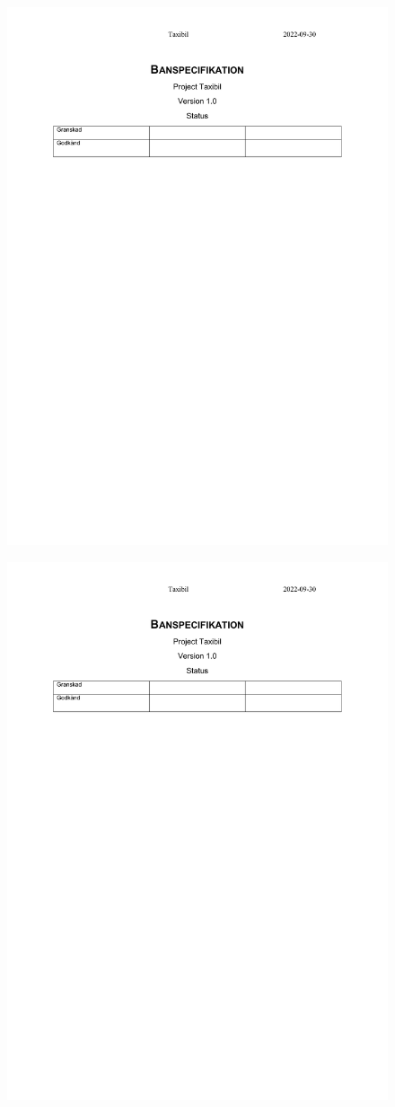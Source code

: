 \documentclass[10pt,oneside,swedish]{lips}
\begin{document}
\begin{figure}[H]
    \includegraphics[width=.95\textwidth, page=2]{Banspec.pdf}
\end{figure}
\begin{figure}[H]
    \includegraphics[width=.95\textwidth, page=3]{Banspec.pdf}
\end{figure}
\end{document}
